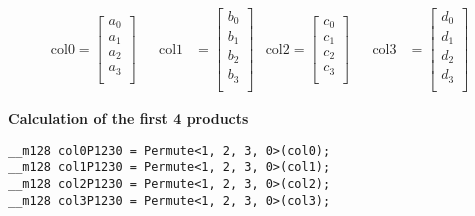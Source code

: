 \documentclass[]{scrartcl}
\begin{document}
\begin{align*}
\mathrm{col0} 
=
\begin{bmatrix}
a_0\\
a_1\\
a_2\\
a_3\\
\end{bmatrix}
&&
\mathrm{col1} 
&=
\begin{bmatrix}
b_0\\
b_1\\
b_2\\
b_3\\
\end{bmatrix}
&
\mathrm{col2} 
=
\begin{bmatrix}
c_0\\
c_1\\
c_2\\
c_3\\
\end{bmatrix}
&&
\mathrm{col3} 
&=
\begin{bmatrix}
d_0\\
d_1\\
d_2\\
d_3\\
\end{bmatrix}
\end{align*}



\vspace{1cm}
\textbf{Calculation of the first 4 products}
\vspace{1cm}

\begin{verbatim}
__m128 col0P1230 = Permute<1, 2, 3, 0>(col0);
__m128 col1P1230 = Permute<1, 2, 3, 0>(col1);
__m128 col2P1230 = Permute<1, 2, 3, 0>(col2);
__m128 col3P1230 = Permute<1, 2, 3, 0>(col3);

\end{verbatim}
\end{document}
